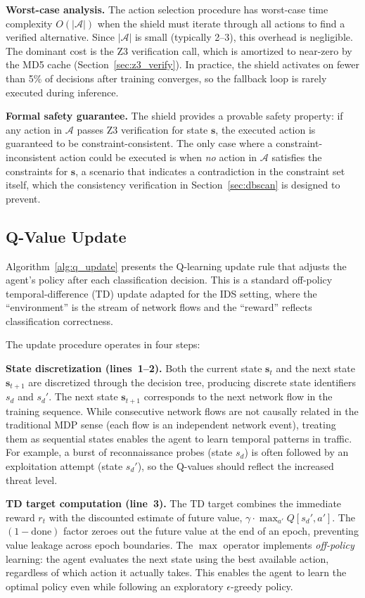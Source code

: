 \documentclass[12pt, letterpaper, oneside]{report}
\newcommand{\bs}{\mathbf{s}}
\begin{document}
\textbf{Worst-case analysis.} The action selection procedure has worst-case time complexity $O(|\mathcal{A}|)$ when the shield must iterate through all actions to find a verified alternative. Since $|\mathcal{A}|$ is small (typically 2--3), this overhead is negligible. The dominant cost is the Z3 verification call, which is amortized to near-zero by the MD5 cache (Section~\ref{sec:z3_verify}). In practice, the shield activates on fewer than 5\% of decisions after training converges, so the fallback loop is rarely executed during inference.

\textbf{Formal safety guarantee.} The shield provides a provable safety property: if any action in $\mathcal{A}$ passes Z3 verification for state $\bs$, the executed action is guaranteed to be constraint-consistent. The only case where a constraint-inconsistent action could be executed is when \emph{no} action in $\mathcal{A}$ satisfies the constraints for $\bs$, a scenario that indicates a contradiction in the constraint set itself, which the consistency verification in Section~\ref{sec:dbscan} is designed to prevent.

\subsection{Q-Value Update}

Algorithm~\ref{alg:q_update} presents the Q-learning update rule that adjusts the agent's policy after each classification decision. This is a standard off-policy temporal-difference (TD) update adapted for the IDS setting, where the ``environment'' is the stream of network flows and the ``reward'' reflects classification correctness.

The update procedure operates in four steps:

\textbf{State discretization (lines~1--2).} Both the current state $\bs_t$ and the next state $\bs_{t+1}$ are discretized through the decision tree, producing discrete state identifiers $s_d$ and $s_d'$. The next state $\bs_{t+1}$ corresponds to the next network flow in the training sequence. While consecutive network flows are not causally related in the traditional MDP sense (each flow is an independent network event), treating them as sequential states enables the agent to learn temporal patterns in traffic. For example, a burst of reconnaissance probes (state $s_d$) is often followed by an exploitation attempt (state $s_d'$), so the Q-values should reflect the increased threat level.

\textbf{TD target computation (line~3).} The TD target combines the immediate reward $r_t$ with the discounted estimate of future value, $\gamma \cdot \max_{a'} Q[s_d', a']$. The $(1 - \text{done})$ factor zeroes out the future value at the end of an epoch, preventing value leakage across epoch boundaries. The $\max$ operator implements \emph{off-policy} learning: the agent evaluates the next state using the best available action, regardless of which action it actually takes. This enables the agent to learn the optimal policy even while following an exploratory $\epsilon$-greedy policy.
\end{document}
